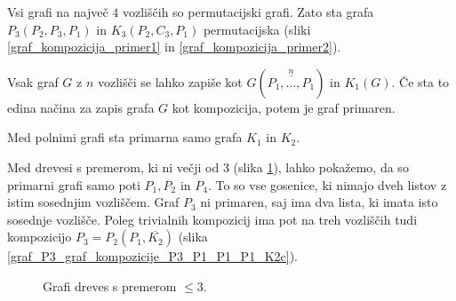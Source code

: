 \documentclass[a4paper, 12pt]{book}
\begin{document}
Vsi grafi na največ $4$ vozliščih so permutacijski grafi. Zato sta grafa $P_3(P_2, P_3, P_1)$ in $K_3(P_2, C_3, P_1)$ permutacijska (sliki \ref{graf_kompozicija_primer1} in \ref{graf_kompozicija_primer2}).

Vsak graf $G$ z $n$ vozlišči se lahko zapiše kot $G(\overset{n}{\overline{P_1, ..., P_1}})$ in $K_1(G)$. Če sta to edina načina za zapis grafa $G$ kot kompozicija, potem je graf primaren.

Med polnimi grafi sta primarna samo grafa $K_1$ in $K_2$.

Med drevesi s premerom, ki ni večji od 3 (slika \ref{graf_dreves_premer_leq3}), lahko pokažemo, da so primarni grafi samo poti $P_1, P_2$ in $P_4$. To so vse gosenice, ki nimajo dveh listov z istim sosednjim vozliščem. Graf $P_3$ ni primaren, saj ima dva lista, ki imata isto sosednje vozlišče. Poleg trivialnih kompozicij ima pot na treh vozliščih tudi kompozicijo $P_3 = P_2(P_1, \overline{K_2})$ (slika \ref{graf_P3_graf_kompozicije_P3_P1_P1_P1_K2c}).

\begin{figure}[h]
    \begin{center}        
    \end{center}
    \caption{Grafi dreves s premerom $\leq 3$.}
    \label{graf_dreves_premer_leq3}
\end{figure}
\end{document}
